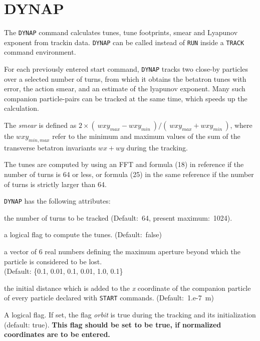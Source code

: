 
\section{DYNAP}

The {\tt DYNAP} command calculates tunes, tune footprints, smear and
Lyapunov exponent from trackin data. {\tt DYNAP} can be called
instead of {\tt RUN} inside a {\tt TRACK} command environment.

 
For each previously entered start command, {\tt DYNAP} tracks two
close-by particles over a selected number of turns, from which it
obtains the betatron tunes with error, the action smear, and an estimate
of the lyapunov exponent. 
Many such companion particle-pairs can be tracked at the same time,
which speeds up the calculation. 

The {\it smear} is defined as  
$2 \times (\ wxy_{max} - wxy_{min}\ ) / (\ wxy_{max} + wxy_{min}\ )$,
where the $wxy_{min,max}$ refer to the  minimum and
maximum values of the sum of the transverse betatron invariants
$wx+wy$ during the tracking. 

The tunes are computed by using an FFT and formula (18) in reference 
\cite{bartolini1995} if the number of turns is 64 or less, or formula (25) in 
the same reference if the number of turns is strictly larger than 64.
 
{\tt DYNAP} has the following attributes: 
\begin{madlist}
    the number of turns to be tracked (Default:~64,
   present maximum:~1024). 
     
    a logical flag to compute the tunes. (Default:~false)
 
    a vector of 6 real numbers defining the maximum
   aperture beyond which the particle is considered to be lost.\\
   (Default: \{0.1, 0.01, 0.1, 0.01, 1.0, 0.1\}
     
    the initial distance which is added to the
   {\it x} coordinate of the companion particle of every particle
   declared with {\tt START} commands. (Default:~1.e-7~m)
   
    A logical flag. If set, the flag {\it orbit} 
   is true during the tracking and its initialization
   (default: true).
   {\bf This flag should be set to be true, if 
     normalized coordinates are to be entered.}
\end{madlist}

